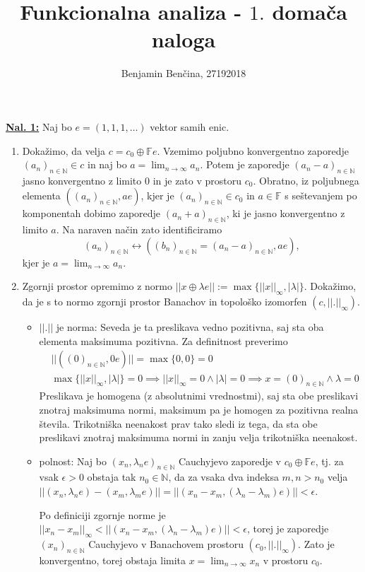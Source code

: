 \documentclass[a4paper, 12pt]{article}
\title{Funkcionalna analiza - $1.$ domača naloga}
\author{Benjamin Benčina, 27192018}
\newcommand{\N}{\mathbb{N}}
\newcommand{\F}{\mathbb{F}}
\begin{document}
\maketitle

\underline{\textbf{Nal. 1:}}
Naj bo $e = (1, 1, 1,\dots)$ vektor samih enic.
\begin{enumerate}[label=(\alph*)]
	\item Dokažimo, da velja $c = c_0 \oplus \F e$. Vzemimo poljubno konvergentno zaporedje $(a_n)_{n \in \N} \in c$ in naj bo $a = \lim_{n \to \infty}a_n$. Potem je zaporedje $(a_n - a)_{n\in\N}$ jasno konvergentno z limito $0$ in je zato v prostoru $c_0$. Obratno, iz poljubnega elementa $((a_n)_{n\in\N}, ae)$, kjer je $(a_n)_{n\in\N} \in c_0$ in $a \in \F$ s seštevanjem po komponentah dobimo zaporedje $(a_n + a)_{n\in\N}$, ki je jasno konvergentno z limito $a$. Na naraven način zato identificiramo
	\[
	(a_n)_{n\in\N} \leftrightarrow ((b_n)_{n\in\N} = (a_n - a)_{n\in\N}, ae),
	\]
	kjer je $a = \lim_{n\to\infty}a_n$.
	\item Zgornji prostor opremimo z normo $||x \oplus \lambda e|| := \max\lbrace||x||_\infty, |\lambda|\rbrace$. Dokažimo, da je s to normo zgornji prostor Banachov in topološko izomorfen $(c, ||.||_\infty)$.
	\begin{itemize}
		\item $||.||$ je norma:
		Seveda je ta preslikava vedno pozitivna, saj sta oba elementa maksimuma pozitivna. Za definitnost preverimo
		\begin{align*}
		&||((0)_{n\in\N}, 0e)|| = \max\lbrace 0, 0\rbrace = 0 \\
		&\max\lbrace ||x||_\infty, |\lambda|\rbrace = 0 \implies ||x||_\infty = 0 \land |\lambda| = 0 \implies x = (0)_{n\in\N} \land \lambda = 0
		\end{align*}
		Preslikava je homogena (z absolutnimi vrednostmi), saj sta obe preslikavi znotraj maksimuma normi, maksimum pa je homogen za pozitivna realna števila. Trikotniška neenakost prav tako sledi iz tega, da sta obe preslikavi znotraj maksimuma normi in zanju velja trikotniška neenakost.
		\item polnost:
		Naj bo $(x_n, \lambda_n e)_{n\in\N}$ Cauchyjevo zaporedje v $c_0 \oplus \F e$, tj. za vsak $\epsilon > 0$ obstaja tak $n_0 \in \N$, da za vsaka dva indeksa $m,n > n_0$ velja $||(x_n, \lambda_n e) - (x_m, \lambda_m e)|| = ||(x_n - x_m, (\lambda_n-\lambda_m)e)|| < \epsilon$.
		
		Po definiciji zgornje norme je $||x_n - x_m||_\infty < ||(x_n - x_m, (\lambda_n-\lambda_m)e)|| < \epsilon$,
		torej je zaporedje $(x_n)_{n\in\N}$ Cauchyjevo v Banachovem prostoru $(c_0, ||.||_\infty)$. Zato je konvergentno, torej obstaja limita $x = \lim_{n \to \infty} x_n$ v prostoru $c_0$.
		

\end{itemize}
\end{enumerate}
\end{document}
